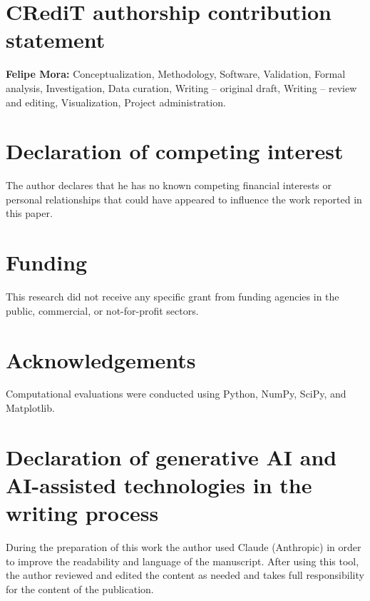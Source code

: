 \documentclass[preprint,12pt]{elsarticle}
\begin{document}
\section*{CRediT authorship contribution statement}

\textbf{Felipe Mora:} Conceptualization, Methodology, Software, Validation, Formal analysis, Investigation, Data curation, Writing -- original draft, Writing -- review and editing, Visualization, Project administration.

\section*{Declaration of competing interest}

The author declares that he has no known competing financial interests or personal relationships that could have appeared to influence the work reported in this paper.

\section*{Funding}

This research did not receive any specific grant from funding agencies in the public, commercial, or not-for-profit sectors.

\section*{Acknowledgements}

Computational evaluations were conducted using Python, NumPy, SciPy, and Matplotlib.

\section*{Declaration of generative AI and AI-assisted technologies in the writing process}

During the preparation of this work the author used Claude (Anthropic) in order to improve the readability and language of the manuscript. After using this tool, the author reviewed and edited the content as needed and takes full responsibility for the content of the publication.



\end{document}
